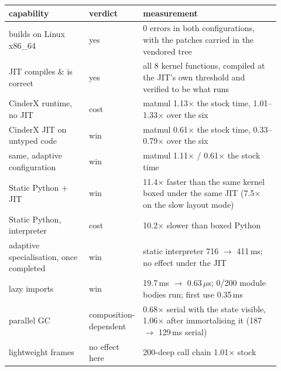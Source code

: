 \begin{tabular}{p{0.30\linewidth}p{0.10\linewidth}p{0.52\linewidth}}
\toprule
capability & verdict & measurement \\
\midrule
builds on Linux x86\_64 & yes & 0 errors in both configurations, with the patches carried in the vendored tree \\
JIT compiles \& is correct & yes & all 8 kernel functions, compiled at the JIT's own threshold and verified to be what runs \\
CinderX runtime, no JIT & cost & matmul 1.13$\times$ the stock time, 1.01--1.33$\times$ over the six \\
CinderX JIT on untyped code & win & matmul 0.61$\times$ the stock time, 0.33--0.79$\times$ over the six \\
same, adaptive configuration & win & matmul 1.11$\times$ / 0.61$\times$ the stock time \\
Static Python + JIT & win & 11.4$\times$ faster than the same kernel boxed under the same JIT (7.5$\times$ on the slow layout mode) \\
Static Python, interpreter & cost & 10.2$\times$ slower than boxed Python \\
adaptive specialisation, once completed & win & static interpreter 716 $\to$ 411\,ms; no effect under the JIT \\
lazy imports & win & 19.7\,ms $\to$ 0.63\,$\mu$s; 0/200 module bodies run; first use 0.35\,ms \\
parallel GC & composition-dependent & 0.68$\times$ serial with the state visible, 1.06$\times$ after immortalising it (187 $\to$ 129\,ms serial) \\
lightweight frames & no effect here & 200-deep call chain 1.01$\times$ stock \\
\bottomrule
\end{tabular}
